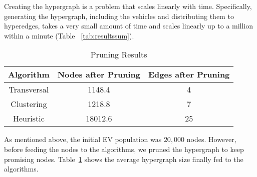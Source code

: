Creating the hypergraph is a problem that scales linearly with time. Specifically, generating the hypergraph, including the vehicles and distributing them to hyperedges, takes a very small amount of time and scales linearly up to a million within a minute (Table ~\ref{tab:resultssum}).
\begin{table}
	\begin{center}
		\begin{tabular}{| c || c | c | }
			\hline
			Algorithm & Nodes after Pruning & Edges after Pruning \\ \hline
			Transversal & 1148.4   & 4  \\ \hline
			Clustering  & 1218.8   & 7 \\ \hline
			Heuristic   & 18012.6  & 25 \\ \hline
		\end{tabular}
	\end{center} 
	\caption{Pruning Results\label{tab:pruningres}}
\end{table}
As mentioned above, the initial EV population was $20,000$ nodes. However, before feeding the nodes to the algorithms, we pruned the hypergraph to keep promising nodes. Table~\ref{tab:pruningres} shows the average hypergraph size finally fed to the algorithms.

